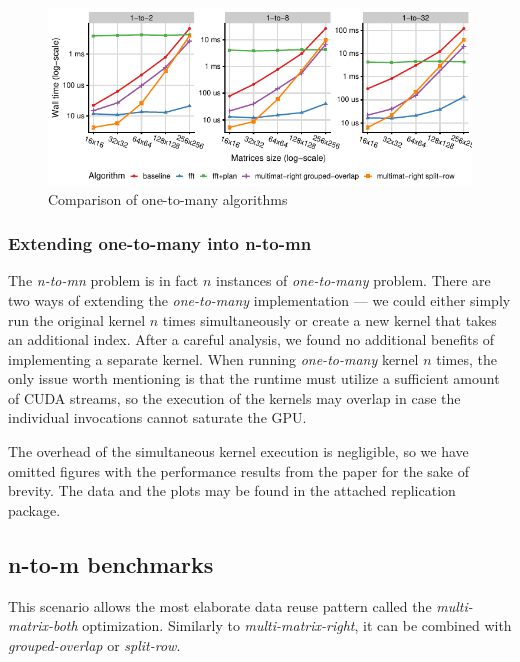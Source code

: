 \begin{figure}[ht]
	\centering
	\includegraphics{crosscorr/plots/one-to-many/one-to-many.pdf}
	\caption{Comparison of one-to-many algorithms}
	\label{fig:one-to-many}
\end{figure}


\subsubsection{Extending one-to-many into n-to-mn}

The \emph{n-to-mn} problem is in fact $n$ instances of \emph{one-to-many} problem. There are two ways of extending the \emph{one-to-many} implementation --- we could either simply run the original kernel $n$ times simultaneously or create a new kernel that takes an additional index. After a careful analysis, we found no additional benefits of implementing a separate kernel. When running \emph{one-to-many} kernel $n$ times, the only issue worth mentioning is that the runtime must utilize a sufficient amount of CUDA streams, so the execution of the kernels may overlap in case the individual invocations cannot saturate the GPU.

The overhead of the simultaneous kernel execution is negligible, so we have omitted figures with the performance results from the paper for the sake of brevity. The data and the plots may be found in the attached replication package.


\subsection{n-to-m benchmarks}

This scenario allows the most elaborate data reuse pattern called the \emph{multi-matrix-both} optimization. Similarly to \emph{multi-matrix-right}, it can be combined with \emph{grouped-overlap} or \emph{split-row}.

